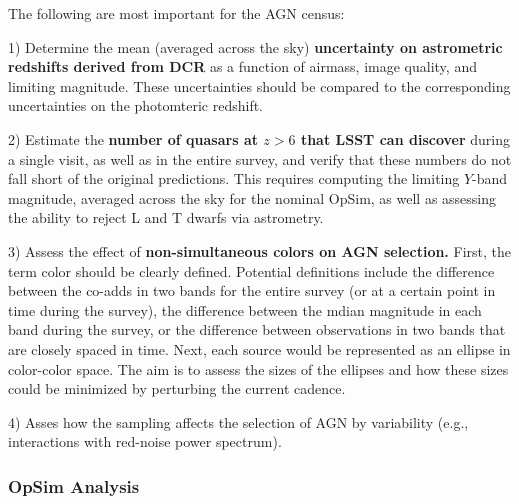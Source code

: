 

The following are most important for the AGN census:

1) Determine the mean (averaged across the sky) {\bf uncertainty on astrometric
redshifts derived from DCR} as a function of airmass, image quality, and
limiting magnitude. These uncertainties should be compared to the
corresponding uncertainties on the photomteric redshift.

2) Estimate the {\bf number of quasars at $z>6$ that LSST can discover}
during a single visit, as well as in the entire survey, and verify that
these numbers do not fall short of the original predictions. This
requires computing the limiting $Y$-band magnitude, averaged
across the sky for the nominal OpSim, as well as assessing the
ability to reject L and T dwarfs via astrometry.

3) Assess the effect of {\bf non-simultaneous colors on AGN selection.}
First, the term color should be clearly defined. Potential definitions
include the difference between the co-adds in two bands for the entire
survey (or at a certain point in time during the survey), the difference
between the mdian magnitude in each band during the survey, or the
difference between observations in two bands that are closely spaced in time.
Next, each source would be represented as an ellipse in color-color space.
The aim is to assess the sizes of the ellipses and how these sizes could be
minimized by perturbing the current cadence.

4) Asses how the sampling affects the selection of AGN by variability (e.g.,
interactions with red-noise power spectrum).



\subsubsection{OpSim Analysis}
\label{sec:\secname:analysis}

